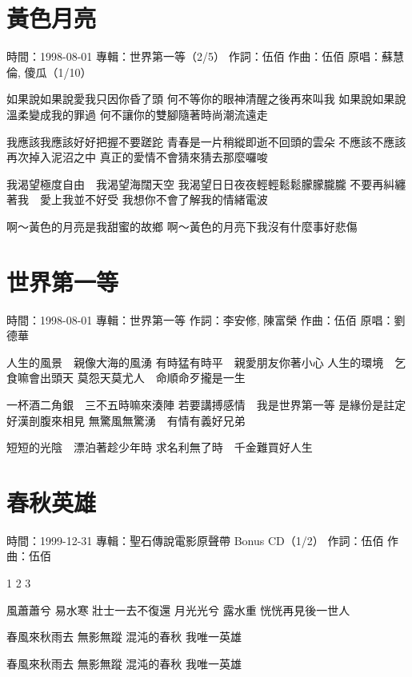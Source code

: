\documentclass[UTF8,a4paper,oneside,twocolumn,12pt]{ctexbook}
\newcommand{\infopair}[2]{\textbullet #1：#2}
\newcommand{\zc}[1][伍佰]{\infopair{作詞}{#1}}
\newcommand{\zq}[1][伍佰]{\infopair{作曲}{#1}}
\newcommand{\zj}[1]{\infopair{專輯}{#1}}
\newcommand{\yc}[1]{\infopair{原唱}{#1}}
\newcommand{\sj}[1]{\infopair{時間}{#1}}
\newenvironment{info}{\begin{flushleft}\kaishu
	}
	{\end{flushleft}\normalsize\yahei\par}
\newenvironment{lyric}{
	}
{}
\begin{document}
\section{黃色月亮}
\begin{info}
	\sj{1998-08-01}
	\zj{世界第一等（2/5）}
	\zc
	\zq
	\yc{蘇慧倫, 傻瓜（1/10）}
\end{info}
\begin{lyric}
	如果說如果說愛我只因你昏了頭  何不等你的眼神清醒之後再來叫我
	如果說如果說溫柔變成我的罪過  何不讓你的雙腳隨著時尚潮流遠走

	我應該我應該好好把握不要蹉跎  青春是一片稍縱即逝不回頭的雲朵
	不應該不應該再次掉入泥沼之中  真正的愛情不會猜來猜去那麼囉唆

	我渴望極度自由　我渴望海闊天空  我渴望日日夜夜輕輕鬆鬆朦朦朧朧
	不要再糾纏著我　愛上我並不好受  我想你不會了解我的情緒電波

	啊～黃色的月亮是我甜蜜的故鄉  啊～黃色的月亮下我沒有什麼事好悲傷
\end{lyric}

\section{世界第一等}
\begin{info}
	\sj{1998-08-01}
	\zj{世界第一等}
	\zc[李安修, 陳富榮]
	\zq
	\yc{劉德華}
\end{info}
\begin{lyric}
	人生的風景　親像大海的風湧
	有時猛有時平　親愛朋友你著小心
	人生的環境　乞食嘛會出頭天
	莫怨天莫尤人　命順命歹攏是一生

	一杯酒二角銀　三不五時嘛來湊陣
	若要講搏感情　我是世界第一等
	是緣份是註定　好漢剖腹來相見
	無驚風無驚湧　有情有義好兄弟

	短短的光陰　漂泊著趁少年時
	求名利無了時　千金難買好人生
\end{lyric}

\section{春秋英雄}
\begin{info}
	\sj{1999-12-31}
	\zj{聖石傳說電影原聲帶 Bonus CD（1/2）}
	\zc
	\zq
\end{info}
\begin{lyric}
	1
	2
	3

	風蕭蕭兮 易水寒 壯士一去不復還
	月光光兮 露水重 恍恍再見後一世人

	春風來秋雨去 無影無蹤
	混沌的春秋 我唯一英雄

	春風來秋雨去 無影無蹤
	混沌的春秋 我唯一英雄
\end{lyric}
\end{document}
